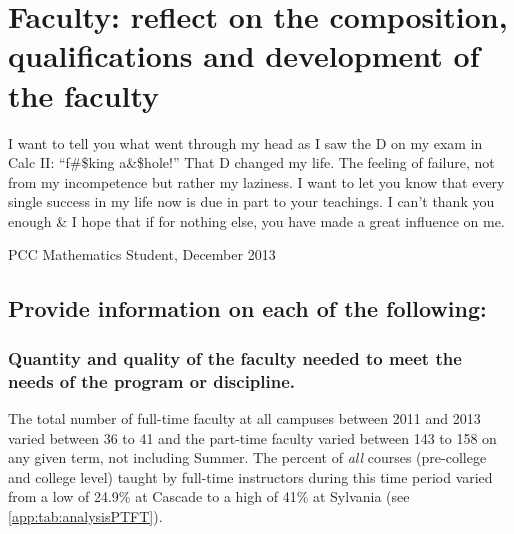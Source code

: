\chapter[Faculty composition and qualifications]{Faculty:  reflect on the
composition, qualifications and development of the faculty}
\epigraph{ %
I want to tell you what went through my head as I saw the D on my  exam in
Calc II:  ``f\#\$king a\&\$hole!''  That D changed my life.  The feeling of
failure, not from my incompetence but rather my laziness.
I want to let you know that every single success in my life now is due in part
to your teachings.  I can't thank you enough \& I hope that if for nothing
else, you have made a great influence on me.}{PCC Mathematics
Student, December 2013}


\section[Faculty composition]{Provide information on each of the following:}
\subsection[Quantity and quality of the faculty]{Quantity and quality of the faculty needed to meet the needs of the
program or discipline.}
The total number of full-time faculty at all campuses between 2011 and 2013
varied between 36 to 41 and the 
part-time faculty varied between 143 to 158 on any given term,  not including
Summer.     The percent of \emph{all} courses (pre-college and college level)
taught by full-time instructors during this time period varied from a low of
24.9\% at Cascade to a high of 41\% at Sylvania (see
\cref{app:tab:analysisPTFT}).

